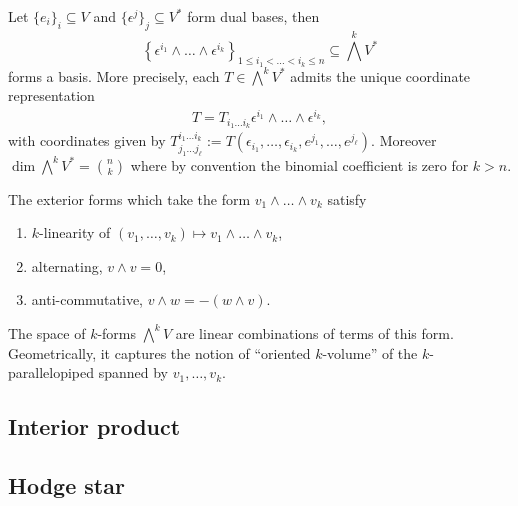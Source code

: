 \begin{proposition}
	Let $\{e_i\}_i \subseteq V$ and $\{\epsilon^j\}_j \subseteq V^*$ form dual bases, then 
	\[ \left\{ \epsilon^{i_1} \wedge \dots \wedge \epsilon^{i_k}  \right\}_{1 \leq i_1 < \dots < i_k \leq n} \subseteq\bigwedge^k V^* \]
	forms a basis. More precisely, each $T \in \bigwedge^k V^*$ admits the unique coordinate representation
		\begin{align*}
			T = T_{i_1 \dots i_k} \epsilon^{i_1} \wedge \dots \wedge \epsilon^{i_k},
		\end{align*}
	with coordinates given by $T^{i_1\dots i_k}_{j_1 \dots j_\ell} := T(\epsilon_{i_1}, \dots , \epsilon_{i_k} ,e^{j_1} , \dots, e^{j_\ell})$. Moreover $\dim \bigwedge^k V^* = \binom{n}{k}$ where by convention the binomial coefficient is zero for $k > n$.
\end{proposition}


\begin{example}
	The exterior forms which take the form $v_1 \wedge \dots \wedge v_k$ satisfy
\begin{enumerate}
	\item $k$-linearity of $(v_1, \dots, v_k) \mapsto v_1 \wedge \dots \wedge v_k$,
	\item alternating, $v \wedge v = 0$, 
	\item anti-commutative, $v \wedge w = -  (w \wedge v)$.
\end{enumerate}
The space of $k$-forms $\bigwedge^k V$ are linear combinations of terms of this form. Geometrically, it captures the notion of ``oriented $k$-volume'' of the $k$-parallelopiped spanned by $v_1, \dots, v_k$. 
\end{example}

\subsection{Interior product}

\subsection{Hodge star}


